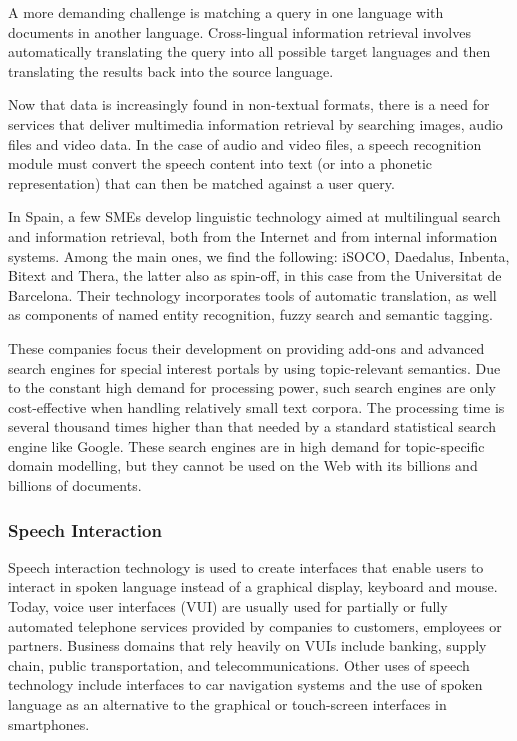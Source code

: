 \begin{multicols}{2}
A more demanding challenge is matching a query in one language with documents in another language. Cross-lingual information retrieval involves automatically translating the query into all possible target languages and then translating the results back into the source language. 

Now that data is increasingly found in non-textual formats, there is a need for services that deliver multimedia information retrieval by searching images, audio files and video data. In the case of audio and video files, a speech recognition module must convert the speech content into text (or into a phonetic representation) that can then be matched against a user query.

In Spain, a few SMEs develop linguistic technology aimed at multilingual search and information retrieval, both from the Internet and from internal information systems. Among the main ones, we find the following: iSOCO, Daedalus, Inbenta, Bitext  and Thera, the latter also as spin-off, in this case from the Universitat de Barcelona. Their technology incorporates tools of automatic translation, as well as components of named entity recognition, fuzzy search and semantic tagging.

These companies focus their development on providing add-ons and advanced search engines for special interest portals by using topic-relevant semantics. Due to the constant high demand for processing power, such search engines are only cost-effective when handling relatively small text corpora. The processing time is several thousand times higher than that needed by a standard statistical search engine like Google. These search engines are in high demand for topic-specific domain modelling, but they cannot be used on the Web with its billions and billions of documents.

\subsubsection{Speech Interaction}


Speech interaction technology is used to create interfaces that enable users to interact in spoken language instead of a graphical display, keyboard and mouse. Today, voice user interfaces (VUI) are usually used for partially or fully automated telephone services provided by companies to customers, employees or partners. Business domains that rely heavily on VUIs include banking, supply chain, public transportation, and telecommunications. Other uses of speech technology include interfaces to car navigation systems and the use of spoken language as an alternative to the graphical or touch-screen interfaces in smartphones. 


\end{multicols}
